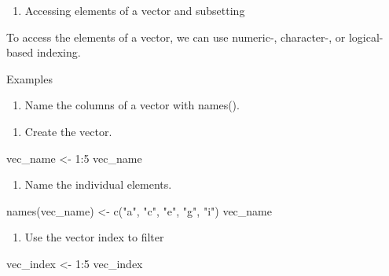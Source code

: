 \documentclass[
  letterpaper,
  DIV=11,
  numbers=noendperiod]{scrreprt}
\newenvironment{Shaded}{}{}
\newcommand{\DecValTok}[1]{\textcolor[rgb]{0.00,0.36,0.77}{#1}}
\newcommand{\FunctionTok}[1]{\textcolor[rgb]{0.44,0.26,0.76}{#1}}
\newcommand{\NormalTok}[1]{\textcolor[rgb]{0.14,0.16,0.18}{#1}}
\newcommand{\OtherTok}[1]{\textcolor[rgb]{0.44,0.26,0.76}{#1}}
\newcommand{\SpecialCharTok}[1]{\textcolor[rgb]{0.00,0.36,0.77}{#1}}
\newcommand{\StringTok}[1]{\textcolor[rgb]{0.01,0.18,0.38}{#1}}
\providecommand{\tightlist}{%
  \setlength{\itemsep}{0pt}\setlength{\parskip}{0pt}}\usepackage{longtable,booktabs,array}
\begin{document}
\begin{enumerate}
\def\labelenumi{\Alph{enumi})}
\setcounter{enumi}{3}
\tightlist
\item
  Accessing elements of a vector and subsetting
\end{enumerate}

To access the elements of a vector, we can use numeric-, character-, or
logical-based indexing.

Examples

\begin{enumerate}
\def\labelenumi{\arabic{enumi}.}
\tightlist
\item
  Name the columns of a vector with names().
\end{enumerate}

\begin{enumerate}
\def\labelenumi{\alph{enumi})}
\tightlist
\item
  Create the vector.
\end{enumerate}

\begin{Shaded}
\begin{Highlighting}[]
\NormalTok{vec\_name }\OtherTok{\textless{}{-}} \DecValTok{1}\SpecialCharTok{:}\DecValTok{5}
\NormalTok{vec\_name}
\end{Highlighting}
\end{Shaded}

\begin{enumerate}
\def\labelenumi{\alph{enumi})}
\setcounter{enumi}{1}
\tightlist
\item
  Name the individual elements.
\end{enumerate}

\begin{Shaded}
\begin{Highlighting}[]
\FunctionTok{names}\NormalTok{(vec\_name) }\OtherTok{\textless{}{-}} \FunctionTok{c}\NormalTok{(}\StringTok{"a"}\NormalTok{, }\StringTok{"c"}\NormalTok{, }\StringTok{"e"}\NormalTok{, }\StringTok{"g"}\NormalTok{, }\StringTok{"i"}\NormalTok{)}
\NormalTok{vec\_name}
\end{Highlighting}
\end{Shaded}

\begin{enumerate}
\def\labelenumi{\arabic{enumi}.}
\setcounter{enumi}{1}
\tightlist
\item
  Use the vector index to filter
\end{enumerate}

\begin{Shaded}
\begin{Highlighting}[]
\NormalTok{vec\_index }\OtherTok{\textless{}{-}} \DecValTok{1}\SpecialCharTok{:}\DecValTok{5}
\NormalTok{vec\_index}
\end{Highlighting}
\end{Shaded}
\end{document}

